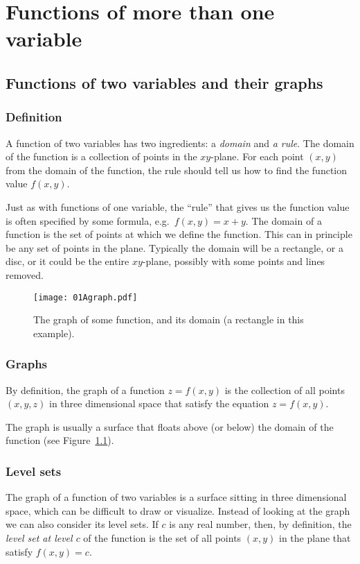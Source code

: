 \chapter{Functions of more than one variable} 

\section{Functions of two variables and their graphs} 
\subsection{Definition} 
A function of two variables has two ingredients: a \textit{domain} and \textit{a
rule}.  The domain of the function is a collection of points in the $xy$-plane.
For each point $(x,y)$ from the domain of the function, the rule
should tell us how to find the function value $f(x,y)$.

Just as with functions of one variable, the ``rule'' that gives us the function
value is often specified by some formula, e.g.~$f(x,y) = x+y$.  The domain of a
function is the set of points at which we define the function.  This can in
principle be any set of points in the plane.  Typically the domain will be a
rectangle, or a disc, or it could be the entire $xy$-plane, possibly with some
points and lines removed.

\begin{figure}[h]
  \begin{center}
    \texttt{[image: 01Agraph.pdf]}
  \end{center}
  \caption{The graph of some function, and its domain (a rectangle in this
  example).}
  \label{fig:01Agraph}
\end{figure}

\subsection{Graphs} By definition, the graph of a function 
$z=f(x,y)$ is the collection of all points $(x,y,z)$ in three dimensional space
that satisfy the equation $z=f(x,y)$.

The graph is usually a surface that floats above (or below) the domain of the
function (see Figure~\ref{fig:01Agraph}).

\subsection{Level sets}  The graph of a function of two variables 
is a surface sitting in three dimensional space, which can be difficult to draw
or visualize.  Instead of looking at the graph we can also consider its level
sets.  If $c$ is any real number, then, by definition, the \emph{level set at
level $c$} of the function is the set of all points $(x,y)$ in the plane that
satisfy $f(x,y) = c$.

